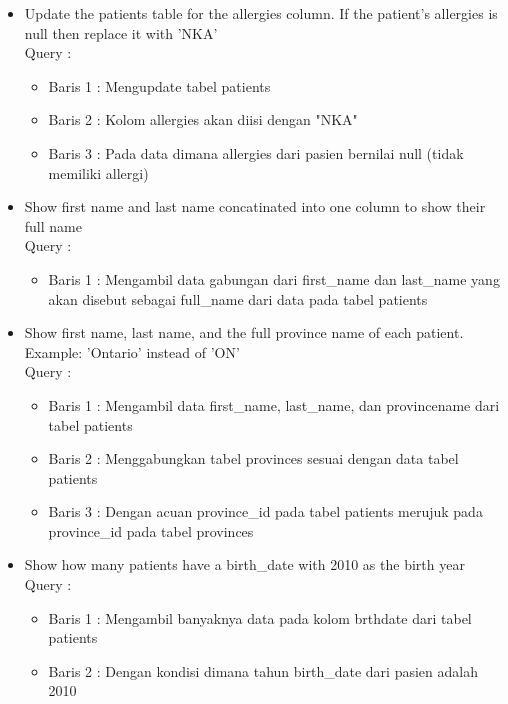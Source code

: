 \documentclass[]{article}
\begin{document}
\begin{itemize}
        \item Update the patients table for the allergies column. If the patient's allergies is null then replace it with 'NKA'
        \\Query :
        
        \begin{itemize}
            \item Baris 1 : Mengupdate tabel patients
            \item Baris 2 : Kolom allergies akan diisi dengan "NKA"
            \item Baris 3 : Pada data dimana allergies dari pasien bernilai null (tidak memiliki allergi)
        \end{itemize}

        \item Show first name and last name concatinated into one column to show their full name
        \\Query :
        
        \begin{itemize}
            \item Baris 1 : Mengambil data gabungan dari first\_name dan last\_name yang akan disebut sebagai full\_name dari data pada tabel patients
        \end{itemize}

        \item Show first name, last name, and the full province name of each patient. Example: 'Ontario' instead of 'ON'
        \\Query :
        
        \begin{itemize}
            \item Baris 1 : Mengambil data first\_name, last\_name, dan provincename dari tabel patients
            \item Baris 2 : Menggabungkan tabel provinces sesuai dengan data tabel patients
            \item Baris 3 : Dengan acuan province\_id pada tabel patients merujuk pada province\_id pada tabel provinces
        \end{itemize}

        \item Show how many patients have a birth\_date with 2010 as the birth year
        \\Query :
        
        \begin{itemize}
            \item Baris 1 : Mengambil banyaknya data pada kolom brthdate dari tabel patients
            \item Baris 2 : Dengan kondisi dimana tahun birth\_date dari pasien adalah 2010
        \end{itemize}


\end{itemize}
\end{document}

